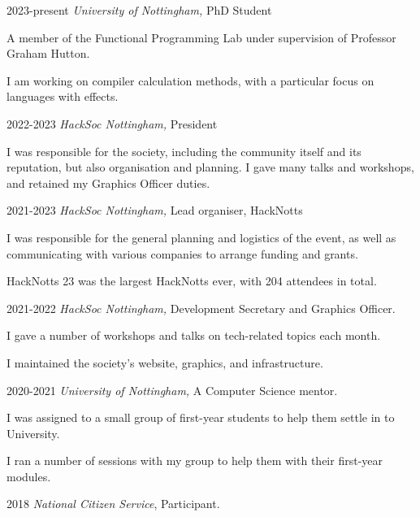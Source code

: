 \documentclass[12pt]{article}
\begin{document}
\begin{explist}
	\item[2023-present] \textit{University of Nottingham,} PhD Student
	{\small \begin{explist}
		\item A member of the Functional Programming Lab under supervision of Professor Graham Hutton.
		\item I am working on compiler calculation methods, with a particular focus on languages with effects.
	\end{explist}}
	\item[2022-2023] \textit{HackSoc Nottingham,} President
	{\small \begin{explist}
		\item I was responsible for the society, including the community itself and its reputation, but also organisation and planning. I gave many talks and workshops, and retained my Graphics Officer duties.
	\end{explist}}
	\item[2021-2023] \textit{HackSoc Nottingham,} Lead organiser, HackNotts
	{\small \begin{explist}
		\item I was responsible for the general planning and logistics of the event, as well as communicating with various companies to arrange funding and grants.
		\item HackNotts 23 was the largest HackNotts ever, with 204 attendees in total.
	\end{explist}}
	\item[2021-2022] \textit{HackSoc Nottingham,} Development Secretary and Graphics Officer.
	{\small \begin{explist}
		\item I gave a number of workshops and talks on tech-related topics each month.
		\item I maintained the society's website, graphics, and infrastructure.
	\end{explist}}
	\item[2020-2021] \textit{University of Nottingham,} A Computer Science mentor.
	{\small \begin{explist}
		\item I was assigned to a small group of first-year students to help them settle in to University.
		\item I ran a number of sessions with my group to help them with their first-year modules.
	\end{explist}}
	\item[2018] \textit{National Citizen Service}, Participant.

\end{explist}
\end{document}
